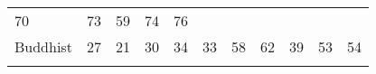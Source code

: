 \documentclass[]{article}
\begin{document}
\begin{longtable}[]{@{}lllllllllll@{}}
\begin{minipage}[t]{0.05\columnwidth}
70\strut
\end{minipage} & \begin{minipage}[t]{0.06\columnwidth}\raggedright\strut
73\strut
\end{minipage} & \begin{minipage}[t]{0.06\columnwidth}\raggedright\strut
59\strut
\end{minipage} & \begin{minipage}[t]{0.04\columnwidth}\raggedright\strut
74\strut
\end{minipage} & \begin{minipage}[t]{0.11\columnwidth}\raggedright\strut
76\strut
\end{minipage}\tabularnewline
\begin{minipage}[t]{0.14\columnwidth}\raggedright\strut
Buddhist\strut
\end{minipage} & \begin{minipage}[t]{0.04\columnwidth}\raggedright\strut
27\strut
\end{minipage} & \begin{minipage}[t]{0.05\columnwidth}\raggedright\strut
21\strut
\end{minipage} & \begin{minipage}[t]{0.05\columnwidth}\raggedright\strut
30\strut
\end{minipage} & \begin{minipage}[t]{0.05\columnwidth}\raggedright\strut
34\strut
\end{minipage} & \begin{minipage}[t]{0.05\columnwidth}\raggedright\strut
33\strut
\end{minipage} & \begin{minipage}[t]{0.05\columnwidth}\raggedright\strut
58\strut
\end{minipage} & \begin{minipage}[t]{0.06\columnwidth}\raggedright\strut
62\strut
\end{minipage} & \begin{minipage}[t]{0.06\columnwidth}\raggedright\strut
39\strut
\end{minipage} & \begin{minipage}[t]{0.04\columnwidth}\raggedright\strut
53\strut
\end{minipage} & \begin{minipage}[t]{0.11\columnwidth}\raggedright\strut
54\strut
\end{minipage}\tabularnewline
\begin{minipage}[t]{0.14\columnwidth}\raggedright\strut

\end{minipage}
\end{longtable}
\end{document}
